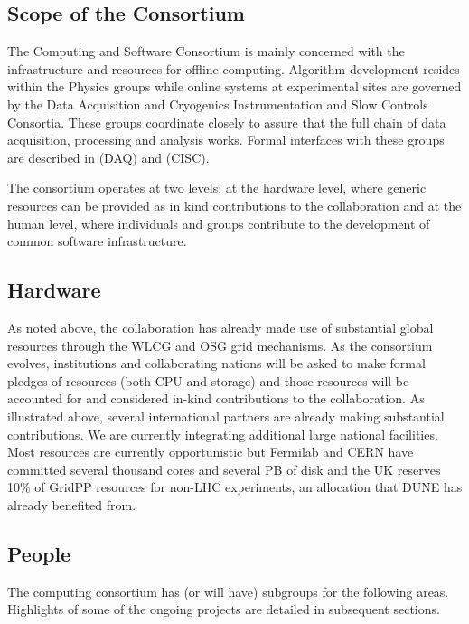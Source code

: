 \subsection{Scope of the Consortium}
The Computing and Software Consortium  is mainly concerned with the infrastructure and resources for offline computing.  Algorithm development resides within the Physics groups while online systems at experimental sites are governed by the Data Acquisition and Cryogenics Instrumentation and Slow Controls Consortia. These groups coordinate closely to assure that the full chain of data acquisition, processing and analysis works. Formal interfaces with these groups are described in (DAQ)\cite{bib:docdb7123} and (CISC)\cite{bib:docdb7126}.

The consortium operates at two levels; at the hardware level, where generic resources can be provided as in kind contributions to the collaboration and at the human level, where individuals and groups contribute to the development of common software infrastructure. 

\subsection{Hardware}
As noted above, the collaboration has already made use of substantial global resources through the WLCG and OSG grid mechanisms. As the consortium evolves, institutions and collaborating nations will be asked to make formal pledges of resources (both CPU and storage) and those resources will be accounted for and considered in-kind contributions to the collaboration.
As illustrated above, several international partners are already making substantial contributions. We are currently integrating additional large national facilities. Most resources are currently opportunistic but Fermilab and CERN have committed several thousand cores and several PB of disk and the UK reserves 10\% of GridPP resources for non-LHC experiments, an allocation that DUNE has already benefited from.



\subsection{People}

The computing consortium has (or will have) subgroups for the following areas.  Highlights of some of the ongoing projects are detailed in subsequent sections. 

